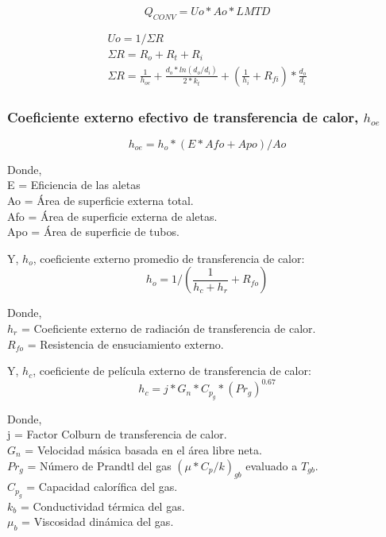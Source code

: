 \begin{equation}
Q_{CONV} = Uo *Ao *LMTD
\end{equation}

\begin{gather*}
\label{}
Uo  = 1 / \Sigma R \\
\Sigma R = R_o + R_t + R_i \\
\Sigma R =  \frac{1}{h_{oe}} 
            +\frac{d_o*ln(d_o/d_i)}{2*k_t} 
            +(\frac{1}{h_i}+R_{fi})*\frac{d_o}{d_i} 
\end{gather*}

\subsubsection{Coeficiente externo efectivo de transferencia de calor, $h_{oe}$}
\begin{equation*}
h_{oe} = h_o * (E *Afo +Apo) / Ao
\end{equation*}

\par Donde,\\
E = Eficiencia de las aletas\\
Ao = Área de superficie externa total.\\
Afo = Área de superficie externa de aletas. \\
Apo = Área de superficie de tubos. \\

\par Y, $h_o$, coeficiente externo promedio de transferencia de calor: 
\begin{equation*}
h_o = 1/(\frac{1}{h_c+h_r}+R_{fo})
\end{equation*}

\par Donde,\\
$h_r$ = Coeficiente externo de radiación de transferencia de calor.\\
$R_{fo}$ = Resistencia de ensuciamiento externo. \\

\par Y, $h_c$, coeficiente de película externo de transferencia de calor: 
\begin{equation*}
h_c = j *G_n *C_{p_g} *(Pr_g)^{0.67}
\end{equation*}

\par Donde,\\
j = Factor Colburn de transferencia de calor.\\
$G_n$ = Velocidad másica basada en el área libre neta.\\
$Pr_g$ = Número de Prandtl del gas $(\mu*C_p /k)_{gb}$ evaluado a $T_{gb}$.\\
$C_{p_g}$ = Capacidad calorífica del gas.\\
$k_b$ = Conductividad térmica del gas.\\
$\mu_b$ = Viscosidad dinámica del gas.\\

